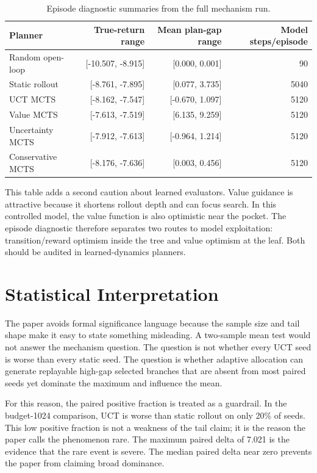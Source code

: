 \documentclass{article}
\begin{document}
\begin{table}[htbp]
\caption{Episode diagnostic summaries from the full mechanism run.}
\label{tab:episode-seeds}
\begin{center}
\small
\begin{tabular}{lrrr}
\toprule
Planner & True-return range & Mean plan-gap range & Model steps/episode \\
\midrule
Random open-loop & [-10.507, -8.915] & [0.000, 0.001] & 90 \\
Static rollout & [-8.761, -7.895] & [0.077, 3.735] & 5040 \\
UCT MCTS & [-8.162, -7.547] & [-0.670, 1.097] & 5120 \\
Value MCTS & [-7.613, -7.519] & [6.135, 9.259] & 5120 \\
Uncertainty MCTS & [-7.912, -7.613] & [-0.964, 1.214] & 5120 \\
Conservative MCTS & [-8.176, -7.636] & [0.003, 0.456] & 5120 \\
\bottomrule
\end{tabular}
\end{center}
\end{table}

This table adds a second caution about learned evaluators. Value guidance is attractive because it shortens rollout depth and can focus search. In this controlled model, the value function is also optimistic near the pocket. The episode diagnostic therefore separates two routes to model exploitation: transition/reward optimism inside the tree and value optimism at the leaf. Both should be audited in learned-dynamics planners.

\section{Statistical Interpretation}

The paper avoids formal significance language because the sample size and tail shape make it easy to state something misleading. A two-sample mean test would not answer the mechanism question. The question is not whether every UCT seed is worse than every static seed. The question is whether adaptive allocation can generate replayable high-gap selected branches that are absent from most paired seeds yet dominate the maximum and influence the mean.

For this reason, the paired positive fraction is treated as a guardrail. In the budget-1024 comparison, UCT is worse than static rollout on only 20\% of seeds. This low positive fraction is not a weakness of the tail claim; it is the reason the paper calls the phenomenon rare. The maximum paired delta of 7.021 is the evidence that the rare event is severe. The median paired delta near zero prevents the paper from claiming broad dominance.
\end{document}
